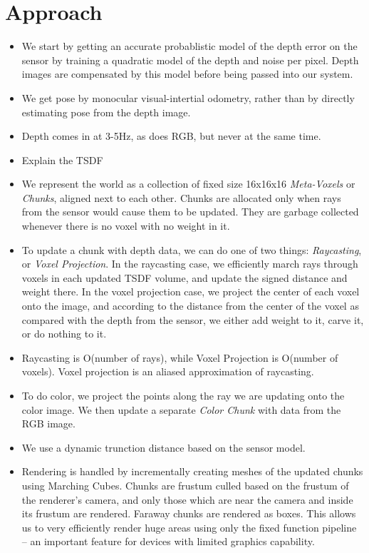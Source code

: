 \documentclass[conference,10pt]{IEEEtran}
\begin{document}
\section{Approach}
\begin{itemize}
    \item We start by getting an accurate probablistic model of the depth error
    on the sensor by training a quadratic model of the depth and noise per
    pixel. Depth images are compensated by this model before being passed into
    our system.
    \item We get pose by monocular visual-intertial odometry, rather than by
    directly estimating pose from the depth image.
    \item Depth comes in at 3-5Hz, as does RGB, but never at the same time.
    \item Explain the TSDF
    \item We represent the world as a collection of fixed size 16x16x16
    \emph{Meta-Voxels} or \emph{Chunks}, aligned next to each other. Chunks are
    allocated only when rays from the sensor would cause them to be updated.
    They are garbage collected whenever there is no voxel with no weight in it.
    \item To update a chunk with depth data, we can do one of two things:
    \emph{Raycasting}, or \emph{Voxel Projection}. In the raycasting case, we
    efficiently march rays through voxels in each updated TSDF volume, and
    update the signed distance and weight there. In the voxel projection case,
    we project the center of each voxel onto the image, and according to the
    distance from the center of the voxel as compared with the depth from the
    sensor, we either add weight to it, carve it, or do nothing to it.
    \item Raycasting is O(number of rays), while Voxel Projection is O(number
    of voxels). Voxel projection is an aliased approximation of raycasting. 
    \item To do color, we project the points along the ray we are updating onto
    the color image. We then update a separate \emph{Color Chunk} with data from
    the RGB image.
    \item We use a dynamic trunction distance based on the sensor model.
    \item Rendering is handled by incrementally creating meshes of the updated
    chunks using Marching Cubes. Chunks are frustum culled based on the frustum
    of the renderer's camera, and only those which are near the camera and
    inside its frustum are rendered. Faraway chunks are rendered as boxes. This
    allows us to very efficiently render huge areas using only the fixed
    function pipeline -- an important feature for devices with limited graphics
    capability.
\end{itemize}
\end{document}
